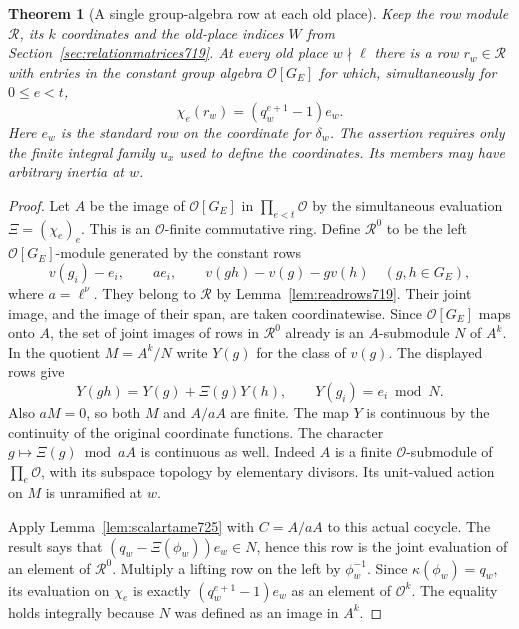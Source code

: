 \documentclass[a4paper,11pt]{article}
\newtheorem{theorem}[proposition]{Theorem}
\theoremstyle{definition}
\theoremstyle{remark}
\numberwithin{equation}{section}
\begin{document}
\begin{theorem}[A single group-algebra row at each old place]\leavevmode
\label{thm:jointtamerow725}
Keep the row module \(\mathcal R\), its \(k\) coordinates and the old-place
indices \(W\) from Section~\ref{sec:relationmatrices719}. At every old
place \(w\nmid\ell\) there is a row \(r_w\in\mathcal R\) with entries in
the constant group algebra \(\mathcal O[G_E]\) for which, simultaneously
for \(0\le e<t\),
\[
                     \chi_e(r_w)=(q_w^{e+1}-1)e_w .
\]
Here \(e_w\) is the standard row on the coordinate for \(\delta_w\).
The assertion requires only the finite integral family \(u_x\) used to
define the coordinates. Its members may have arbitrary inertia at \(w\).
\end{theorem}
\begin{proof}
Let \(A\) be the image of \(\mathcal O[G_E]\) in \(\prod_{e<t}\mathcal O\)
by the simultaneous evaluation \(\Xi=(\chi_e)_e\). This is an
\(\mathcal O\)-finite commutative ring. Define \(\mathcal R^0\) to be
the left \(\mathcal O[G_E]\)-module generated by the constant rows
\[
 v(g_i)-e_i,\qquad a e_i,\qquad v(gh)-v(g)-g v(h)
                       \quad(g,h\in G_E),
\]
where \(a=\ell^\nu\). They belong to \(\mathcal R\) by
Lemma~\ref{lem:readrows719}. Their joint image, and the image of their
span, are taken coordinatewise. Since \(\mathcal O[G_E]\) maps onto
\(A\), the set of joint images of rows in \(\mathcal R^0\) already is
an \(A\)-submodule \(N\) of \(A^k\). In the quotient \(M=A^k/N\) write
\(Y(g)\) for the class of \(v(g)\). The displayed rows give
\[
          Y(gh)=Y(g)+\Xi(g)Y(h),\qquad Y(g_i)=e_i\bmod N .
\]
Also \(aM=0\), so both \(M\) and \(A/aA\) are finite. The map \(Y\)
is continuous by the continuity of the original coordinate functions.
The character \(g\mapsto\Xi(g)\bmod aA\) is continuous as well.
Indeed \(A\) is a finite \(\mathcal O\)-submodule of
\(\prod_e\mathcal O\), with its subspace topology by elementary divisors.
Its unit-valued action on \(M\) is unramified at \(w\).

Apply Lemma~\ref{lem:scalartame725} with \(C=A/aA\) to this actual
cocycle. The result says that \((q_w-\Xi(\phi_w))e_w\in N\), hence
this row is the joint evaluation of an element of \(\mathcal R^0\).
Multiply a lifting row on the left by \(\phi_w^{-1}\). Since
\(\kappa(\phi_w)=q_w\), its evaluation on \(\chi_e\) is exactly
\((q_w^{e+1}-1)e_w\) as an element of \(\mathcal O^k\). The equality
holds integrally because \(N\) was defined as an image in \(A^k\).
\end{proof}
\end{document}

